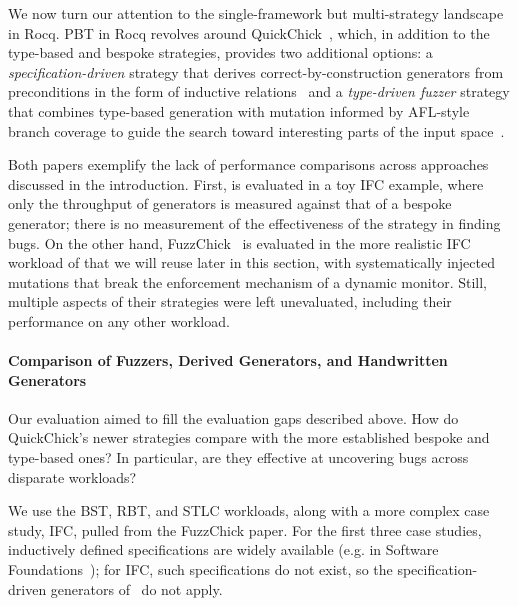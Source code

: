We now turn our attention to the single-framework but multi-strategy landscape in Rocq.
PBT in Rocq revolves around QuickChick~\cite{LeoThesis2018}, which, in addition to the
type-based and bespoke strategies, provides two additional options: a {\em
    specification-driven} strategy that derives correct-by-construction generators from
preconditions in the form of inductive relations~\cite{GeneratingGoodGenerators} and a
  {\em type-driven fuzzer} strategy that combines type-based generation with mutation
informed by AFL-style branch coverage to guide the search toward interesting parts of
the input space~\cite{FuzzChick}.

Both papers exemplify the lack of performance comparisons across approaches discussed
in the introduction. First, \cite{GeneratingGoodGenerators} is evaluated in a toy IFC
example, where only the throughput of generators is measured against that of a bespoke
generator; there is no measurement of the effectiveness of the strategy in finding
bugs. On the other hand, FuzzChick~\cite{FuzzChick} is evaluated in the more realistic
IFC workload of \cite{TestingNIjfp} that we will reuse later in this section, with
systematically injected mutations that break the enforcement mechanism of a dynamic
monitor. Still, multiple aspects of their strategies were left unevaluated, including
their performance on any other workload.

\paragraph*{Comparison of Fuzzers, Derived Generators, and Handwritten Generators}
\label{evaluating-generators-rocq-fuzz}

Our evaluation aimed to fill the evaluation gaps described above. How do QuickChick's
newer strategies compare with the more established bespoke and type-based ones? In
particular, are they effective at uncovering bugs across disparate workloads?

We use the BST, RBT, and STLC workloads, along with a more complex case study, IFC,
pulled from the FuzzChick paper. For the first three case studies, inductively defined
specifications are widely available (e.g. in Software Foundations~\cite{Pierce:SF});
for IFC, such specifications do not exist, so the specification-driven generators
of~\cite{GeneratingGoodGenerators} do not apply.

